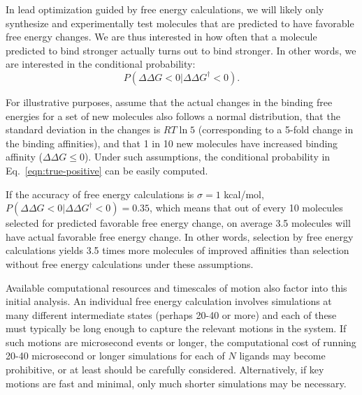 \documentclass[9pt,bestpractices]{livecoms}
\begin{document}
In lead optimization guided by free energy calculations, we will likely only
synthesize and experimentally test molecules that are predicted to
have favorable free energy changes.  We are thus interested in how
often that a molecule predicted to bind stronger actually turns out to
bind stronger. In other words, we are interested in the conditional
probability:
\begin{equation}
  P(\Delta\Delta G<0|\Delta\Delta G^\dagger<0).
  \label{eqn:true-positive}
\end{equation}

For illustrative purposes, assume that the actual changes in the
binding free energies for a set of new molecules also follows a normal
distribution, that the standard deviation in the changes is $RT\ln 5$
(corresponding to a 5-fold change in the binding affinities), and that
1 in 10 new molecules have increased binding affinity ($\Delta\Delta G
\leq 0$).  Under such assumptions, the conditional probability in
Eq.~\ref{eqn:true-positive} can be easily computed. 

If the accuracy of free energy calculations is $\sigma = 1$ kcal/mol, $P(\Delta\Delta
G<0|\Delta\Delta G^\dagger<0) = 0.35$, which means that out of every
10 molecules selected for predicted favorable free energy change, on
average 3.5 molecules will have actual favorable free energy change.
In other words, selection by free energy calculations yields 3.5 times
more molecules of improved affinities than selection without free
energy calculations under these assumptions.
  
Available computational resources and timescales of motion also factor
into this initial analysis. An individual free energy calculation
involves simulations at many different intermediate states (perhaps
20-40 or more) and each of these must typically be long enough to
capture the relevant motions in the system. If such motions are
microsecond events or longer, the computational cost of running 20-40
microsecond or longer simulations for each of $N$ ligands may become
prohibitive, or at least should be carefully considered. Alternatively, if key motions are fast and minimal, only much shorter simulations may be necessary. 
\end{document}
